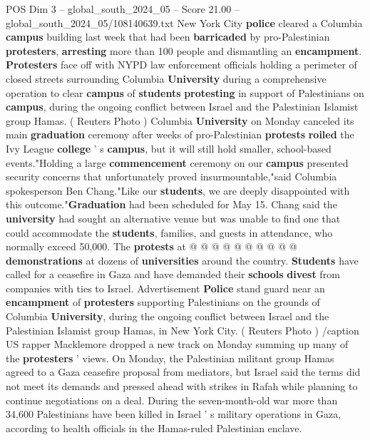 \begin{textsample}{POS Dim 3 – global\_south\_2024\_05 – Score 21.00 – global\_south\_2024\_05/108140639.txt}  \label{ex:f3_pos_107}
New York City \textbf{police} cleared a Columbia \textbf{campus} building last week that had been \textbf{barricaded} by pro-Palestinian \textbf{protesters}, \textbf{arresting} more than 100 people and dismantling an \textbf{encampment}. \textbf{Protesters} face off with NYPD law enforcement officials holding a perimeter of closed streets surrounding Columbia \textbf{University} during a comprehensive operation to clear \textbf{campus} of \textbf{students} \textbf{protesting} in support of Palestinians on \textbf{campus}, during the ongoing conflict between Israel and the Palestinian Islamist group Hamas. ( Reuters Photo ) Columbia \textbf{University} on Monday canceled its main \textbf{graduation} ceremony after weeks of pro-Palestinian \textbf{protests} \textbf{roiled} the Ivy League \textbf{college} ' s \textbf{campus}, but it will still hold smaller, school-based events."Holding a large \textbf{commencement} ceremony on our \textbf{campus} presented security concerns that unfortunately proved insurmountable,"said Columbia spokesperson Ben Chang."Like our \textbf{students}, we are deeply disappointed with this outcome."\textbf{Graduation} had been scheduled for May 15.
Chang said the \textbf{university} had sought an alternative venue but was unable to find one that could accommodate the \textbf{students}, families, and guests in attendance, who normally exceed 50,000.
The \textbf{protests} at @ @ @ @ @ @ @ @ @ @ \textbf{demonstrations} at dozens of \textbf{universities} around the country. \textbf{Students} have called for a ceasefire in Gaza and have demanded their \textbf{schools} \textbf{divest} from companies with ties to Israel.
Advertisement \textbf{Police} stand guard near an \textbf{encampment} of \textbf{protesters} supporting Palestinians on the grounds of Columbia \textbf{University}, during the ongoing conflict between Israel and the Palestinian Islamist group Hamas, in New York City. ( Reuters Photo ) /caption US rapper Macklemore dropped a new track on Monday summing up many of the \textbf{protesters} ' views.
On Monday, the Palestinian militant group Hamas agreed to a Gaza ceasefire proposal from mediators, but Israel said the terms did not meet its demands and pressed ahead with strikes in Rafah while planning to continue negotiations on a deal.
During the seven-month-old war more than 34,600 Palestinians have been killed in Israel ' s military operations in Gaza, according to health officials in the Hamas-ruled Palestinian enclave.

\end{textsample}
